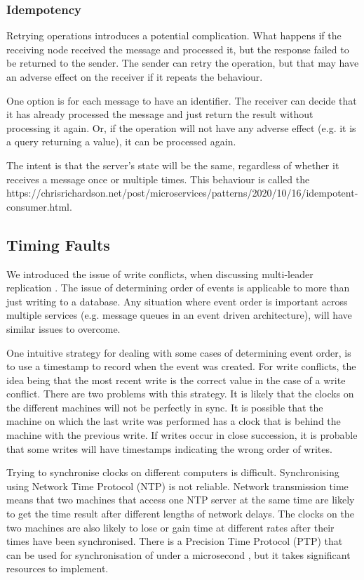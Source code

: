 \subsubsection{Idempotency}
Retrying operations introduces a potential complication.
What happens if the receiving node received the message and processed it, but the response failed to be returned to the sender.
The sender can retry the operation, but that may have an adverse effect on the receiver if it repeats the behaviour.

One option is for each message to have an identifier.
The receiver can decide that it has already processed the message and just return the result without processing it again.
Or, if the operation will not have any adverse effect (e.g. it is a query returning a value), it can be processed again.

The intent is that the server's state will be the same, regardless of whether it receives a message once or multiple times.
This behaviour is called the 
{https://chrisrichardson.net/post/microservices/patterns/2020/10/16/idempotent-consumer.html}.

\subsection{Timing Faults}\label{timing}
We introduced the issue of write conflicts, when discussing multi-leader replication \cite{distributed2-notes}.
The issue of determining order of events is applicable to more than just writing to a database.
Any situation where event order is important across multiple services (e.g. message queues in an event driven architecture),
will have similar issues to overcome.

One intuitive strategy for dealing with some cases of determining event order,
is to use a timestamp to record when the event was created.
For write conflicts, the idea being that the most recent write is the correct value in the case of a write conflict.
There are two problems with this strategy.
It is likely that the clocks on the different machines will not be perfectly in sync.
It is possible that the machine on which the last write was performed has a clock that is behind the machine with the previous write.
If writes occur in close succession, it is probable that some writes will have timestamps indicating the wrong order of writes.

Trying to synchronise clocks on different computers is difficult.
Synchronising using Network Time Protocol (NTP) is not reliable.
Network transmission time means that two machines that access one NTP server at the same time
are likely to get the time result after different lengths of network delays.
The clocks on the two machines are also likely to lose or gain time at different rates after their times have been synchronised.
There is a Precision Time Protocol (PTP) that can be used for synchronisation of under a microsecond \cite{ieee-1588},
but it takes significant resources to implement.

